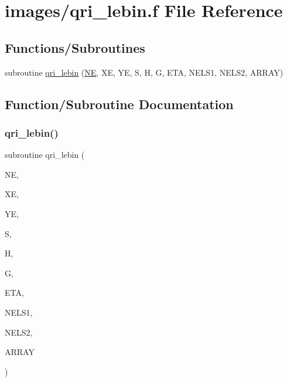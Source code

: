 \hypertarget{qri__lebin_8f}{}\section{images/qri\+\_\+lebin.f File Reference}
\label{qri__lebin_8f}
\subsection*{Functions/\+Subroutines}
\begin{DoxyCompactItemize}
\item 
subroutine \hyperlink{qri__lebin_8f_a3cfc3ca2aa5c7473f23a21654bc5066b}{qri\+\_\+lebin} (\hyperlink{eval__tab_8h_a5af9139e882aef6c820ae908589a40d6}{NE}, XE, YE, S, H, G, E\+TA, N\+E\+L\+S1, N\+E\+L\+S2, A\+R\+R\+AY)
\end{DoxyCompactItemize}


\subsection{Function/\+Subroutine Documentation}
\mbox{\label{qri__lebin_8f_a3cfc3ca2aa5c7473f23a21654bc5066b}} 
\subsubsection{\texorpdfstring{qri\+\_\+lebin()}{qri\_lebin()}}
{\footnotesize\ttfamily subroutine qri\+\_\+lebin (\begin{DoxyParamCaption}\item[{integer}]{NE,  }\item[{double precision, dimension(ne)}]{XE,  }\item[{double precision, dimension(ne)}]{YE,  }\item[{double precision}]{S,  }\item[{double precision}]{H,  }\item[{double precision}]{G,  }\item[{double precision}]{E\+TA,  }\item[{integer}]{N\+E\+L\+S1,  }\item[{integer}]{N\+E\+L\+S2,  }\item[{double precision, dimension(nels1,nels2)}]{A\+R\+R\+AY }\end{DoxyParamCaption})}

